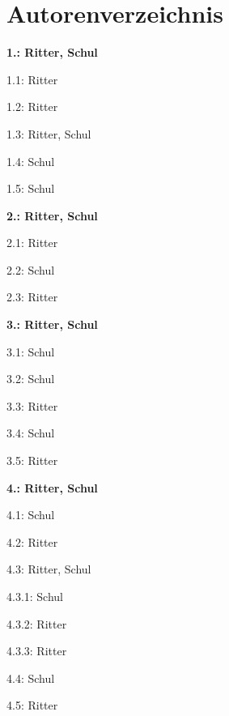 \documentclass[12pt]{report}
\begin{document}
\section{Autorenverzeichnis}
\begin{center}

\begin{multicols}{2}
\begin{compactitem}
\item[] \textbf{1.: Ritter, Schul}

\begin{compactitem}
\item[] 1.1: Ritter
\item[] 1.2: Ritter
\item[] 1.3: Ritter, Schul
\item[] 1.4: Schul
\item[] 1.5: Schul
\end{compactitem}

\item[] \textbf{2.: Ritter, Schul}
\begin{compactitem}
\item[] 2.1: Ritter
\item[] 2.2: Schul
\item[] 2.3: Ritter
\end{compactitem}

\item[] \textbf{3.: Ritter, Schul}
\begin{compactitem}
\item[] 3.1: Schul
\item[] 3.2: Schul
\item[] 3.3: Ritter
\item[] 3.4: Schul
\item[] 3.5: Ritter
\end{compactitem}

\item[] \textbf{4.: Ritter, Schul}
\begin{compactitem}
\item[] 4.1: Schul
\item[] 4.2: Ritter
\item[] 4.3: Ritter, Schul
\begin{compactitem}
\item[] 4.3.1: Schul
\item[] 4.3.2: Ritter
\item[] 4.3.3: Ritter
\end{compactitem}
\item[] 4.4: Schul
\item[] 4.5: Ritter
\end{compactitem}

\end{compactitem}
\end{multicols}
\end{center}
\end{document}
